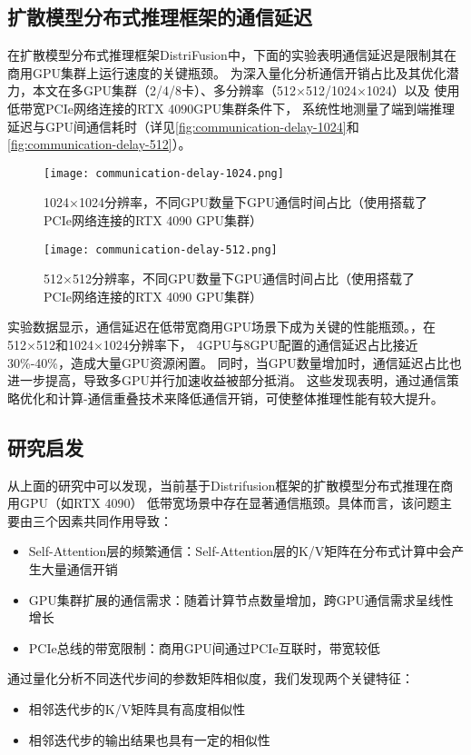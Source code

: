 \subsection{扩散模型分布式推理框架的通信延迟}
\label{sec:diffusion_model_distributed_inference_communication_delay}
\par
在扩散模型分布式推理框架DistriFusion中，下面的实验表明通信延迟是限制其在商用GPU集群上运行速度的关键瓶颈。
为深入量化分析通信开销占比及其优化潜力，本文在多GPU集群（2/4/8卡）、多分辨率（512×512/1024×1024）以及
使用低带宽PCIe网络连接的RTX 4090GPU集群条件下，
系统性地测量了端到端推理延迟与GPU间通信耗时（详见\autoref{fig:communication-delay-1024}和
\autoref{fig:communication-delay-512}）。
\begin{figure}[ht]
    \centering
    \begin{minipage}[t]{0.45\linewidth}
        \centering
        \texttt{[image: communication-delay-1024.png]}
        \caption{1024×1024分辨率，不同GPU数量下GPU通信时间占比（使用搭载了PCIe网络连接的RTX 4090 GPU集群）}
        \label{fig:communication-delay-1024}
    \end{minipage}
    \hfill
    \begin{minipage}[t]{0.45\linewidth}
        \centering
        \texttt{[image: communication-delay-512.png]}
        \caption{512×512分辨率，不同GPU数量下GPU通信时间占比（使用搭载了PCIe网络连接的RTX 4090 GPU集群）}
        \label{fig:communication-delay-512}
    \end{minipage}
\end{figure}
\par
实验数据显示，通信延迟在低带宽商用GPU场景下成为关键的性能瓶颈。，在512×512和1024×1024分辨率下，
4GPU与8GPU配置的通信延迟占比接近30\%-40\%，造成大量GPU资源闲置。
同时，当GPU数量增加时，通信延迟占比也进一步提高，导致多GPU并行加速收益被部分抵消。
这些发现表明，通过通信策略优化和计算-通信重叠技术来降低通信开销，可使整体推理性能有较大提升。
\par
\subsection{研究启发}
从上面的研究中可以发现，当前基于Distrifusion框架的扩散模型分布式推理在商用GPU（如RTX 4090）
低带宽场景中存在显著通信瓶颈。具体而言，该问题主要由三个因素共同作用导致：
\begin{itemize}
    \item Self-Attention层的频繁通信：Self-Attention层的K/V矩阵在分布式计算中会产生大量通信开销
    \item GPU集群扩展的通信需求：随着计算节点数量增加，跨GPU通信需求呈线性增长
    \item PCIe总线的带宽限制：商用GPU间通过PCIe互联时，带宽较低
\end{itemize}
通过量化分析不同迭代步间的参数矩阵相似度，我们发现两个关键特征：
\begin{itemize}
    \item 相邻迭代步的K/V矩阵具有高度相似性
    \item 相邻迭代步的输出结果也具有一定的相似性
\end{itemize}

